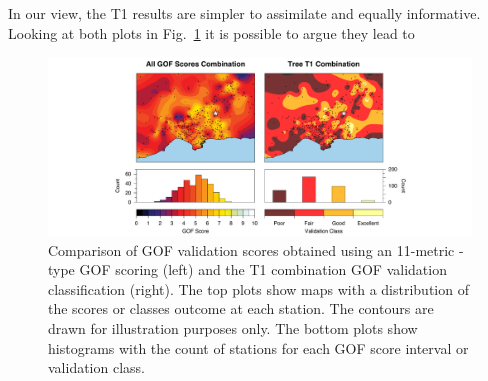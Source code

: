 In our view, the T1 results are simpler to assimilate and equally informative. Looking at both plots in Fig.~\ref{fig:avg-gof-maps} it is possible to argue they lead to 


\begin{figure}[th!]
	\centering
	\includegraphics[width=\textwidth]{figures/pdf/figure-11}
	\caption{Comparison of GOF validation scores obtained using an 11-metric \citet{Anderson_2004_Proc}-type GOF scoring (left) and the T1 combination GOF validation classification (right). The top plots show maps with a distribution of the scores or classes outcome at each station. The contours are drawn for illustration purposes only. The bottom plots show histograms with the count of stations for each GOF score interval or validation class.}
	\label{fig:avg-gof-maps}
\end{figure}

